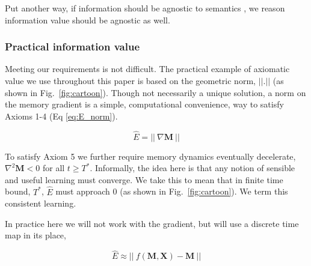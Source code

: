 Put another way, if information should be agnostic to semantics \cite{Shannon1948a}, we reason information value should be agnostic as well.


\subsubsection*{Practical information value}
Meeting our requirements is not difficult. The practical example of axiomatic value we use throughout this paper is based on the geometric norm, $||.||$ (as shown in Fig.~\ref{fig:cartoon}). Though not necessarily a unique solution, a norm on the memory gradient is a simple, computational convenience, way to satisfy Axioms 1-4 (Eq \ref{eq:E_norm}). 

\begin{equation}
	\label{eq:E_norm}
	\hat E = || \ \nabla \mathbf{M} \ ||
\end{equation}

To satisfy Axiom 5 we further require memory dynamics eventually decelerate,  $\nabla^2 \mathbf{M} < 0$ for all $ t \ge T^*$. Informally, the idea here is that any notion of sensible and useful learning must converge. We take this to mean that in finite time bound, $T^*$, $\hat E$ must approach 0 (as shown in Fig.~\ref{fig:cartoon}). We term this consistent learning.

In practice here we will not work with the gradient, but will use a discrete time map in its place,

\begin{equation}
	\label{eq:E_norm_discrete}
	\hat E \approx || \ f(\mathbf{M},\mathbf{X}) - \mathbf{M} \ ||
\end{equation}


